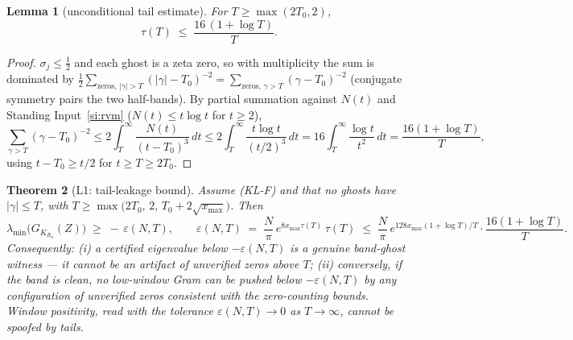 \documentclass[11pt]{article}
\newtheorem{theorem}{Theorem}[section]
\newtheorem{lemma}[theorem]{Lemma}
\theoremstyle{definition}
\theoremstyle{remark}
\begin{document}
\begin{lemma}[unconditional tail estimate]\label{lem:tail-sum}
For $T\ge\max(2T_0,2)$,
\[
\tau(T)\;\le\;\frac{16\,(1+\log T)}{T}.
\]
\end{lemma}

\begin{proof}
$\sigma_j\le\tfrac12$ and each ghost is a zeta zero, so with multiplicity the
sum is dominated by
$\tfrac12\sum_{\text{zeros},\,|\gamma|>T}(|\gamma|-T_0)^{-2}
=\sum_{\text{zeros},\,\gamma>T}(\gamma-T_0)^{-2}$ (conjugate symmetry pairs
the two half-bands). By partial summation against $N(t)$ and Standing
Input~\ref{si:rvm} ($N(t)\le t\log t$ for $t\ge2$),
\[
\sum_{\gamma>T}(\gamma-T_0)^{-2}
\le 2\int_T^{\infty}\frac{N(t)}{(t-T_0)^{3}}\,dt
\le 2\int_T^{\infty}\frac{t\log t}{(t/2)^{3}}\,dt
=16\int_T^{\infty}\frac{\log t}{t^{2}}\,dt
=\frac{16(1+\log T)}{T},
\]
using $t-T_0\ge t/2$ for $t\ge T\ge2T_0$.
\end{proof}

\begin{theorem}[L1: tail-leakage bound]\label{thm:l1}
Assume (KL-F) and that no ghosts have $|\gamma|\le T$, with
$T\ge\max\bigl(2T_0,\,2,\,T_0+2\sqrt{x_{\max}}\bigr)$. Then
\[
\lambda_{\min}\bigl(G_{K_{R_a}}(Z)\bigr)\;\ge\;-\,\varepsilon(N,T),
\qquad
\varepsilon(N,T)\;=\;\frac{N}{\pi}\,e^{8x_{\max}\tau(T)}\,\tau(T)
\;\le\;\frac{N}{\pi}\,e^{128 x_{\max}(1+\log T)/T}\cdot\frac{16(1+\log T)}{T}.
\]
Consequently: \emph{(i)} a certified eigenvalue below $-\varepsilon(N,T)$ is a
genuine band-ghost witness --- it cannot be an artifact of unverified zeros
above $T$; \emph{(ii)} conversely, if the band is clean, no low-window Gram
can be pushed below $-\varepsilon(N,T)$ by any configuration of unverified
zeros consistent with the zero-counting bounds. Window positivity, read with
the tolerance $\varepsilon(N,T)\to0$ as $T\to\infty$, cannot be spoofed by
tails.
\end{theorem}
\end{document}

